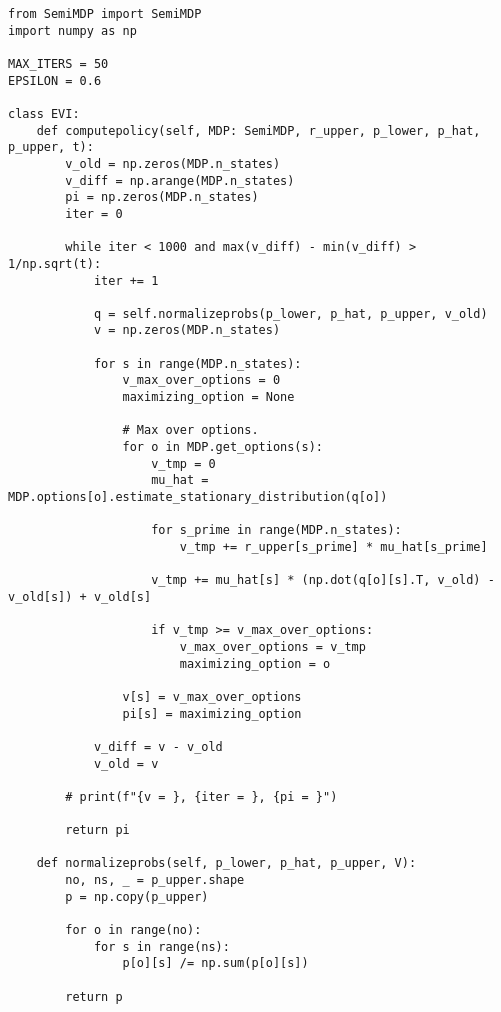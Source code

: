 \begin{verbatim}
from SemiMDP import SemiMDP
import numpy as np

MAX_ITERS = 50
EPSILON = 0.6

class EVI:
    def computepolicy(self, MDP: SemiMDP, r_upper, p_lower, p_hat, p_upper, t):
        v_old = np.zeros(MDP.n_states)
        v_diff = np.arange(MDP.n_states)
        pi = np.zeros(MDP.n_states)
        iter = 0

        while iter < 1000 and max(v_diff) - min(v_diff) > 1/np.sqrt(t):
            iter += 1

            q = self.normalizeprobs(p_lower, p_hat, p_upper, v_old)
            v = np.zeros(MDP.n_states)

            for s in range(MDP.n_states):
                v_max_over_options = 0
                maximizing_option = None

                # Max over options.
                for o in MDP.get_options(s):
                    v_tmp = 0
                    mu_hat = MDP.options[o].estimate_stationary_distribution(q[o])

                    for s_prime in range(MDP.n_states):
                        v_tmp += r_upper[s_prime] * mu_hat[s_prime]

                    v_tmp += mu_hat[s] * (np.dot(q[o][s].T, v_old) - v_old[s]) + v_old[s]

                    if v_tmp >= v_max_over_options:
                        v_max_over_options = v_tmp
                        maximizing_option = o

                v[s] = v_max_over_options
                pi[s] = maximizing_option

            v_diff = v - v_old
            v_old = v

        # print(f"{v = }, {iter = }, {pi = }")

        return pi

    def normalizeprobs(self, p_lower, p_hat, p_upper, V):
        no, ns, _ = p_upper.shape
        p = np.copy(p_upper)

        for o in range(no):
            for s in range(ns):
                p[o][s] /= np.sum(p[o][s])

        return p
\end{verbatim}

\newpage
